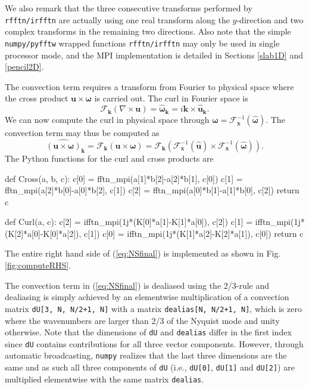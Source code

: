\documentclass[11pt, oneside]{article}
\newcommand{\inpyth}{\lstinline[style=pythonstyle, basicstyle=\ttfamily]} %[]%
\begin{document}
We also remark that the three consecutive transforms performed by \inpyth{rfftn/irfftn} are actually using one real transform along the $y$-direction and two complex transforms in the remaining two directions. Also note that the simple \texttt{numpy/pyfftw} wrapped functions \inpyth{rfftn/irfftn} may only be used in single processor mode, and the MPI implementation is detailed in Sections
\ref{slab1D} and \ref{pencil2D}.

The convection term requires a transform from Fourier to physical space where the cross product $\bm{u} \times \bm{\omega}$ is carried out. The curl in Fourier space is
\begin{equation}
\mathcal{F}_{\bm{k}}(\nabla \times \bm{u}) = \hat{\bm{\omega}}_{\bm{k}} = i \bm{k} \times \hat{\bm{u}}_{\bm{k}}.
\end{equation}
We can now compute the curl in physical space through $\bm{\omega} = \mathcal{F}_{\bm{x}}^{-1}(\hat{\bm{\omega}})$. The convection term may thus be computed as
\begin{equation}
\widehat{( \bm{u} \times \bm{\omega})}_{\bm{k}} = \mathcal{F}_{\bm{k}}(\bm{u} \times \bm{\omega}) = \mathcal{F}_{\bm{k}} (\mathcal{F}^{-1}_{\bm{x}}(\hat{\bm{u}}) \times \mathcal{F}^{-1}_{\bm{x}}(\hat{\bm{\omega}})).
\end{equation}
The Python functions for the curl and cross products are

\begin{python}
def Cross(a, b, c):
    c[0] = fftn_mpi(a[1]*b[2]-a[2]*b[1], c[0])
    c[1] = fftn_mpi(a[2]*b[0]-a[0]*b[2], c[1])
    c[2] = fftn_mpi(a[0]*b[1]-a[1]*b[0], c[2])
    return c

def Curl(a, c):
    c[2] = ifftn_mpi(1j*(K[0]*a[1]-K[1]*a[0]), c[2])
    c[1] = ifftn_mpi(1j*(K[2]*a[0]-K[0]*a[2]), c[1])
    c[0] = ifftn_mpi(1j*(K[1]*a[2]-K[2]*a[1]), c[0])
    return c
\end{python}

The entire right hand side of (\ref{eq:NSfinal}) is implemented as shown in Fig. \ref{fig:computeRHS}.

The convection term in (\ref{eq:NSfinal}) is dealiased using the 2/3-rule and dealiasing is simply achieved by an elementwise multiplication of a convection matrix \inpyth{dU[3, N, N/2+1, N]} with a matrix \inpyth{dealias[N, N/2+1, N]}, which is zero where the wavenumbers are larger than 2/3 of the Nyquist mode and unity otherwise. Note that the dimensions of \inpyth{dU} and \inpyth{dealias} differ in the first index since \inpyth{dU} contains contributions for all three vector components. However, through automatic broadcasting, \texttt{numpy} realizes that the last three dimensions are the same and as such all three components of \inpyth{dU} (i.e.,  \inpyth{dU[0]}, \inpyth{dU[1]} and  \inpyth{dU[2]}) are multiplied elementwise with the same matrix \inpyth{dealias}.
\end{document}
